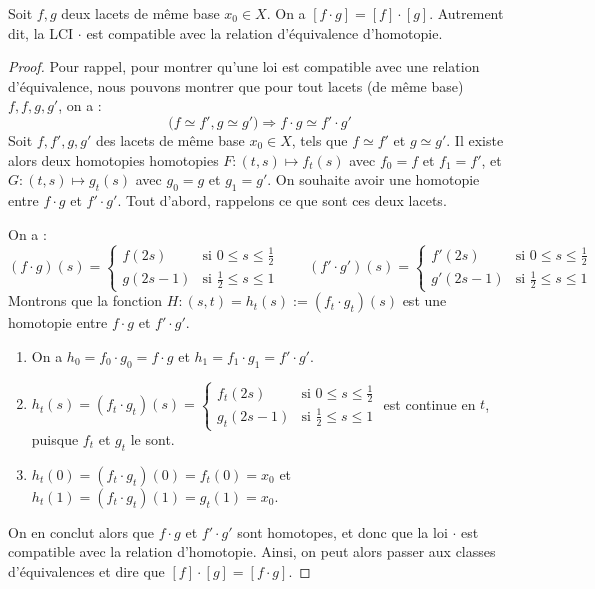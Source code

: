 \documentclass[hidelinks, 10pt]{article}
\begin{document}
\begin{proposition}
Soit $f,g$ deux lacets de même base $x_0\in X$. On a $[f\cdot g]=[f]\cdot[g]$. Autrement dit, la LCI $\cdot$ est compatible avec la relation d'équivalence d'homotopie.
\end{proposition}
\begin{proof}
Pour rappel, pour montrer qu'une loi est compatible avec une relation d'équivalence, nous pouvons montrer que pour tout lacets (de même base) $f,f,g,g'$, on a :\[\big(f\simeq f', g\simeq g'\big)\Longrightarrow f\cdot g\simeq f'\cdot g'\] Soit $f,f',g,g'$ des lacets de même base $x_0\in X$, tels que $f\simeq f'$ et $g\simeq g'$. Il existe alors deux homotopies homotopies $F:(t,s)\mapsto f_t(s)$ avec $f_0=f$ et $f_1=f'$, et $G:(t,s)\mapsto g_t(s)$ avec $g_0=g$ et $g_1=g'$. On souhaite avoir une homotopie entre $f\cdot g$ et $f'\cdot g'$. Tout d'abord, rappelons ce que sont ces deux lacets.

On a : \[(f\cdot g)(s)=\left\{\begin{matrix}
f(2s)&\text{si } 0\leq s\leq \frac{1}{2}\\ 
g(2s-1)&\text{si }\frac{1}{2}\leq s\leq 1
\end{matrix}\right.\qquad (f'\cdot g')(s)=\left\{\begin{matrix}
f'(2s)&\text{si } 0\leq s\leq \frac{1}{2}\\ 
g'(2s-1)&\text{si }\frac{1}{2}\leq s\leq 1
\end{matrix}\right.\]Montrons que la fonction $H:(s,t)=h_t(s):=(f_t\cdot g_t)(s)$ est une homotopie entre $f\cdot g$ et $f'\cdot g'$.\begin{enumerate}
    \item On a $h_0=f_0\cdot g_0=f\cdot g$ et $h_1=f_1\cdot g_1=f'\cdot g'$.
    \item $h_t(s)=(f_t\cdot g_t)(s)=\left\{\begin{matrix}
f_t(2s)&\text{si } 0\leq s\leq \frac{1}{2}\\ 
g_t(2s-1)&\text{si }\frac{1}{2}\leq s\leq 1
\end{matrix}\right.$ est continue en $t$, puisque $f_t$ et $g_t$ le sont.
\item $h_t(0)=(f_t\cdot g_t)(0)=f_t(0)=x_0$ et $h_t(1)=(f_t\cdot g_t)(1)=g_t(1)=x_0$.
\end{enumerate}On en conclut alors que $f\cdot g$ et $f'\cdot g'$ sont homotopes, et donc que la loi $\cdot$ est compatible avec la relation d'homotopie. Ainsi, on peut alors passer aux classes d'équivalences et dire que $[f]\cdot[g]=[f\cdot g]$.
\end{proof}
\end{document}

